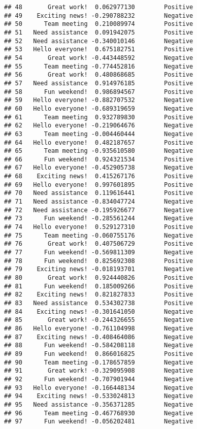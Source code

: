 \documentclass[
]{article}
\begin{document}
\begin{verbatim}
## 48       Great work!  0.062977130        Positive
## 49    Exciting news! -0.290788232        Negative
## 50      Team meeting  0.210089974        Positive
## 51   Need assistance  0.091942075        Positive
## 52   Need assistance -0.340010146        Negative
## 53   Hello everyone!  0.675182751        Positive
## 54       Great work! -0.443448592        Negative
## 55      Team meeting -0.774452816        Negative
## 56       Great work!  0.480868685        Positive
## 57   Need assistance  0.914976185        Positive
## 58      Fun weekend!  0.986894567        Positive
## 59   Hello everyone! -0.882707532        Negative
## 60   Hello everyone! -0.689319659        Negative
## 61      Team meeting  0.932789830        Positive
## 62   Hello everyone! -0.219064676        Negative
## 63      Team meeting -0.004460444        Negative
## 64   Hello everyone!  0.482187657        Positive
## 65      Team meeting -0.935610580        Negative
## 66      Fun weekend!  0.924321534        Positive
## 67   Hello everyone! -0.452905738        Negative
## 68    Exciting news!  0.415267176        Positive
## 69   Hello everyone!  0.997601895        Positive
## 70   Need assistance  0.119616441        Positive
## 71   Need assistance -0.834047724        Negative
## 72   Need assistance -0.195926677        Negative
## 73      Fun weekend! -0.285561244        Negative
## 74   Hello everyone!  0.529127310        Positive
## 75      Team meeting -0.060755176        Negative
## 76       Great work!  0.407506729        Positive
## 77      Fun weekend! -0.569811309        Negative
## 78      Fun weekend!  0.825692308        Positive
## 79    Exciting news! -0.018193701        Negative
## 80       Great work!  0.924440826        Positive
## 81      Fun weekend!  0.185009266        Positive
## 82    Exciting news!  0.821827833        Positive
## 83   Need assistance  0.534302738        Positive
## 84    Exciting news! -0.301641050        Negative
## 85       Great work! -0.244326655        Negative
## 86   Hello everyone! -0.761104998        Negative
## 87    Exciting news! -0.408464086        Negative
## 88      Fun weekend! -0.584208118        Negative
## 89      Fun weekend!  0.866016825        Positive
## 90      Team meeting -0.178657859        Negative
## 91       Great work! -0.329095908        Negative
## 92      Fun weekend! -0.707901944        Negative
## 93   Hello everyone! -0.166448134        Negative
## 94    Exciting news! -0.533024813        Negative
## 95   Need assistance -0.356371285        Negative
## 96      Team meeting -0.467768930        Negative
## 97      Fun weekend! -0.056202481        Negative

\end{verbatim}
\end{document}
